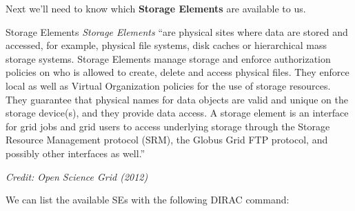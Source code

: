 \begin{Shaded}
\begin{Highlighting}[]
\NormalTok{$ } \NormalTok{~}
\NormalTok{$ } \KeywordTok{;}  
\NormalTok{$ } 
\NormalTok{$ } 
 
\end{Highlighting}
\end{Shaded}

Next we'll need to know which \textbf{Storage Elements} are available to
us.

\begin{infobox}{Storage Elements}
\emph{Storage Elements} ``are physical sites where data are stored and
accessed, for example, physical file systems, disk caches or
hierarchical mass storage systems. Storage Elements manage storage and
enforce authorization policies on who is allowed to create, delete and
access physical files. They enforce local as well as Virtual
Organization policies for the use of storage resources. They guarantee
that physical names for data objects are valid and unique on the storage
device(s), and they provide data access. A storage element is an
interface for grid jobs and grid users to access underlying storage
through the Storage Resource Management protocol (SRM), the Globus Grid
FTP protocol, and possibly other interfaces as well.''

\emph{Credit: Open Science Grid (2012)}
\end{infobox}

We can list the available SEs with the following DIRAC command:

\begin{Shaded}
\begin{Highlighting}[]
\NormalTok{$ } 
                           
\NormalTok{=============================================================================}
\NormalTok{[} \NormalTok{more disks ...]}
           
\NormalTok{[} \NormalTok{more disks ...]}
   
\NormalTok{[} \NormalTok{more disks ...]}
\end{Highlighting}
\end{Shaded}

